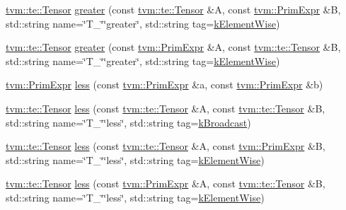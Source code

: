 \begin{DoxyCompactItemize}
\item 
\hyperlink{classtvm_1_1te_1_1Tensor}{tvm\+::te\+::\+Tensor} \hyperlink{namespacetopi_abe01260ad1cf0d3e0d8605798cde1f82}{greater} (const \hyperlink{classtvm_1_1te_1_1Tensor}{tvm\+::te\+::\+Tensor} \&A, const \hyperlink{classtvm_1_1PrimExpr}{tvm\+::\+Prim\+Expr} \&B, std\+::string name=\char`\"{}T\+\_\+\char`\"{}\char`\"{}greater\char`\"{}, std\+::string tag=\hyperlink{namespacetopi_ac1b34ed59d38a5f5338bee6b2cad42be}{k\+Element\+Wise})
\item 
\hyperlink{classtvm_1_1te_1_1Tensor}{tvm\+::te\+::\+Tensor} \hyperlink{namespacetopi_aa77b5534818ae7616e8c14fbb3ef1fad}{greater} (const \hyperlink{classtvm_1_1PrimExpr}{tvm\+::\+Prim\+Expr} \&A, const \hyperlink{classtvm_1_1te_1_1Tensor}{tvm\+::te\+::\+Tensor} \&B, std\+::string name=\char`\"{}T\+\_\+\char`\"{}\char`\"{}greater\char`\"{}, std\+::string tag=\hyperlink{namespacetopi_ac1b34ed59d38a5f5338bee6b2cad42be}{k\+Element\+Wise})
\item 
\hyperlink{classtvm_1_1PrimExpr}{tvm\+::\+Prim\+Expr} \hyperlink{namespacetopi_a6b003a9c4154ba0040d916918eecb7fe}{less} (const \hyperlink{classtvm_1_1PrimExpr}{tvm\+::\+Prim\+Expr} \&a, const \hyperlink{classtvm_1_1PrimExpr}{tvm\+::\+Prim\+Expr} \&b)
\item 
\hyperlink{classtvm_1_1te_1_1Tensor}{tvm\+::te\+::\+Tensor} \hyperlink{namespacetopi_aa8c87beb1aa5b4f5554b63776a87f9de}{less} (const \hyperlink{classtvm_1_1te_1_1Tensor}{tvm\+::te\+::\+Tensor} \&A, const \hyperlink{classtvm_1_1te_1_1Tensor}{tvm\+::te\+::\+Tensor} \&B, std\+::string name=\char`\"{}T\+\_\+\char`\"{}\char`\"{}less\char`\"{}, std\+::string tag=\hyperlink{namespacetopi_a794b9155e9ba9d1c9c42a1cff1fb645f}{k\+Broadcast})
\item 
\hyperlink{classtvm_1_1te_1_1Tensor}{tvm\+::te\+::\+Tensor} \hyperlink{namespacetopi_a8a053740ae2ffedf46b89b88ac0beae4}{less} (const \hyperlink{classtvm_1_1te_1_1Tensor}{tvm\+::te\+::\+Tensor} \&A, const \hyperlink{classtvm_1_1PrimExpr}{tvm\+::\+Prim\+Expr} \&B, std\+::string name=\char`\"{}T\+\_\+\char`\"{}\char`\"{}less\char`\"{}, std\+::string tag=\hyperlink{namespacetopi_ac1b34ed59d38a5f5338bee6b2cad42be}{k\+Element\+Wise})
\item 
\hyperlink{classtvm_1_1te_1_1Tensor}{tvm\+::te\+::\+Tensor} \hyperlink{namespacetopi_a83bebba2755a6399289bf9a2648c9498}{less} (const \hyperlink{classtvm_1_1PrimExpr}{tvm\+::\+Prim\+Expr} \&A, const \hyperlink{classtvm_1_1te_1_1Tensor}{tvm\+::te\+::\+Tensor} \&B, std\+::string name=\char`\"{}T\+\_\+\char`\"{}\char`\"{}less\char`\"{}, std\+::string tag=\hyperlink{namespacetopi_ac1b34ed59d38a5f5338bee6b2cad42be}{k\+Element\+Wise})

\end{DoxyCompactItemize}
